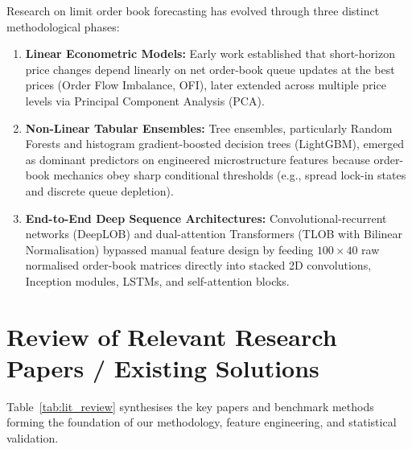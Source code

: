\documentclass[12pt,a4paper,oneside]{report}
\begin{document}
Research on limit order book forecasting has evolved through three distinct methodological phases:
\begin{enumerate}
  \item \textbf{Linear Econometric Models:} Early work established that short-horizon price changes depend linearly on net order-book queue updates at the best prices (Order Flow Imbalance, OFI), later extended across multiple price levels via Principal Component Analysis (PCA).
  \item \textbf{Non-Linear Tabular Ensembles:} Tree ensembles, particularly Random Forests and histogram gradient-boosted decision trees (LightGBM), emerged as dominant predictors on engineered microstructure features because order-book mechanics obey sharp conditional thresholds (e.g., spread lock-in states and discrete queue depletion).
  \item \textbf{End-to-End Deep Sequence Architectures:} Convolutional-recurrent networks (DeepLOB) and dual-attention Transformers (TLOB with Bilinear Normalisation) bypassed manual feature design by feeding $100 \times 40$ raw normalised order-book matrices directly into stacked 2D convolutions, Inception modules, LSTMs, and self-attention blocks.
\end{enumerate}

\section{Review of Relevant Research Papers / Existing Solutions}

Table~\ref{tab:lit_review} synthesises the key papers and benchmark methods forming the foundation of our methodology, feature engineering, and statistical validation.
\end{document}
